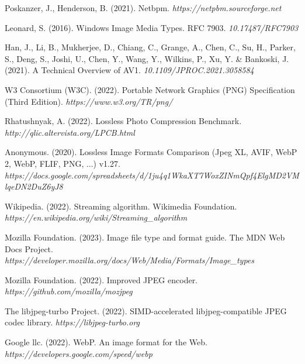 \documentclass[11pt,a4paper]{report}
\begin{document}
\begin{thebibliography}{9}

Poskanzer, J., Henderson, B. (2021). Netbpm. \textit{https://netpbm.sourceforge.net}

Leonard, S. (2016). Windows Image Media Types. RFC 7903. \textit{10.17487/RFC7903}

Han, J., Li, B., Mukherjee, D., Chiang, C., Grange, A., Chen, C., Su, H., Parker, S., Deng, S., Joshi, U., Chen, Y., Wang, Y., Wilkins, P., Xu, Y. \& Bankoski, J. (2021). A Technical Overview of AV1. \textit{10.1109/JPROC.2021.3058584} 

W3 Consortium (W3C). (2022). Portable Network Graphics (PNG) Specification (Third Edition). \textit{https://www.w3.org/TR/png/}

Rhatushnyak, A. (2022). Lossless Photo Compression Benchmark. \textit{http://qlic.altervista.org/LPCB.html}

Anonymous. (2020). Lossless Image Formats Comparison (Jpeg XL, AVIF, WebP 2, WebP, FLIF, PNG, ...) v1.27. \textit{https://docs.google.com/spreadsheets/d/1ju4q1WkaXT7WoxZINmQpf4ElgMD2VMlqeDN2DuZ6yJ8}


Wikipedia. (2022). Streaming algorithm. Wikimedia Foundation. \textit{https://en.wikipedia.org/wiki/Streaming\_algorithm}

Mozilla Foundation. (2023). Image file type and format guide. The MDN Web Docs Project. \textit{https://developer.mozilla.org/docs/Web/Media/Formats/Image\_types}

Mozilla Foundation. (2022). Improved JPEG encoder. \textit{https://github.com/mozilla/mozjpeg}

The libjpeg-turbo Project. (2022). SIMD-accelerated libjpeg-compatible JPEG codec library.
\textit{https://libjpeg-turbo.org}

Google llc. (2022). WebP. An image format for the Web. \textit{https://developers.google.com/speed/webp}


\end{thebibliography}
\end{document}
